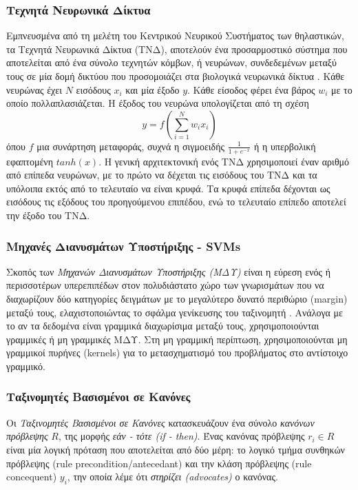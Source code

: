 \subsubsection{Τεχνητά Νευρωνικά Δίκτυα}
Εμπνευσμένα από τη μελέτη του Κεντρικού Νευρικού Συστήματος των θηλαστικών, τα Τεχνητά Νευρωνικά Δίκτυα (ΤΝΔ), αποτελούν ένα προσαρμοστικό σύστημα που αποτελείται από ένα σύνολο τεχνητών κόμβων, ή νευρώνων, συνδεδεμένων μεταξύ τους σε μία δομή δικτύου που προσομοιάζει στα βιολογικά νευρωνικά δίκτυα \cite{zhang2000neural}. Κάθε νευρώνας έχει $N$ εισόδους $x_{i}$ και μία έξοδο $y$. Κάθε είσοδος φέρει ένα βάρος $w_{i}$ με το οποίο πολλαπλασιάζεται. Η έξοδος του νευρώνα υπολογίζεται από τη σχέση 
\begin{equation}
y=f\left( \sum_{i=1}^{N}w_{i}x_{i}\right)
\end{equation} 
όπου $f$ μια συνάρτηση μεταφοράς, συχνά η σιγμοειδής $\frac{1}{1+e^{-x}}$ ή η υπερβολική εφαπτομένη $tanh(x)$.
Η γενική αρχιτεκτονική ενός ΤΝΔ χρησιμοποιεί έναν αριθμό από επίπεδα νευρώνων, με το πρώτο να δέχεται τις εισόδους του ΤΝΔ και τα υπόλοιπα εκτός από το τελευταίο να είναι κρυφά. Τα κρυφά επίπεδα δέχονται ως εισόδους τις εξόδους του προηγούμενου επιπέδου, ενώ το τελευταίο επίπεδο αποτελεί την έξοδο του ΤΝΔ.

\subsubsection{Μηχανές Διανυσμάτων Υποστήριξης - SVMs}
Σκοπός των \emph{Μηχανών Διανυσμάτων Υποστήριξης (ΜΔΥ)} είναι η εύρεση ενός ή περισσοτέρων υπερεπιπέδων στον πολυδιάστατο χώρο των γνωρισμάτων που να διαχωρίζουν δύο κατηγορίες δειγμάτων με το μεγαλύτερο δυνατό περιθώριο (margin) μεταξύ τους, ελαχιστοποιώντας το σφάλμα γενίκευσης του ταξινομητή \cite{boser1992training}. Ανάλογα με το αν τα δεδομένα είναι γραμμικά διαχωρίσιμα μεταξύ τους, χρησιμοποιούνται γραμμικές ή μη γραμμικές ΜΔΥ. Στη μη γραμμική περίπτωση, χρησιμοποιούνται μη γραμμικοί πυρήνες (kernels) για το μετασχηματισμό του προβλήματος στο αντίστοιχο γραμμικό.

\subsubsection{Ταξινομητές Βασισμένοι σε Κανόνες}
\label{subsubsec:ruleBasedClassifiers}
Οι \emph{Ταξινομητές Βασισμένοι σε Κανόνες} κατασκευάζουν ένα σύνολο \emph{κανόνων πρόβλεψης} $R$, της μορφής \emph{εάν - τότε (if - then)}. Ένας κανόνας πρόβλεψης $r_{i} \in R$ είναι μία λογική πρόταση που αποτελείται από δύο μέρη: το λογικό τμήμα συνθηκών πρόβλεψης (rule precondition/antecedant) και την κλάση πρόβλεψης (rule concequent) $y_{i}$, την οποία λέμε ότι \emph{στηρίζει (advocates)} ο κανόνας.

